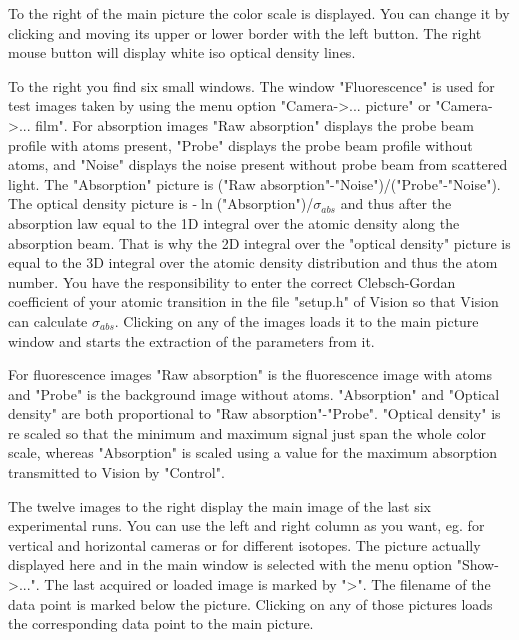 \documentclass[10pt]{article}
\begin{document}
To the right of the main picture the color scale is displayed. You
can change it by clicking and moving its upper or lower border
with the left button. The right mouse button will display white
iso optical density lines.

To the right you find six small windows. The window "Fluorescence"
is used for test images taken by using the menu option
"Camera->... picture" or "Camera->... film". For absorption images
"Raw absorption" displays the probe beam profile with atoms
present, "Probe" displays the probe beam profile without atoms,
and "Noise" displays the noise present without probe beam from
scattered light. The "Absorption" picture is ("Raw
absorption"-"Noise")/("Probe"-"Noise"). The optical density
picture is -$\ln$("Absorption")/$\sigma_{abs}$ and thus after the
absorption law equal to the 1D integral over the atomic density
along the absorption beam. That is why the 2D integral over the
"optical density" picture is equal to the 3D integral over the
atomic density distribution and thus the atom number. You have the
responsibility to enter the correct Clebsch-Gordan coefficient of
your atomic transition in the file "setup.h" of Vision so that
Vision can calculate $\sigma_{abs}$. Clicking on any of the images
loads it to the main picture window and starts the extraction of
the parameters from it.

For fluorescence images "Raw absorption" is the fluorescence image
with atoms and "Probe" is the background image without atoms.
"Absorption" and "Optical density" are both proportional to "Raw
absorption"-"Probe". "Optical density" is re scaled so that the
minimum and maximum signal just span the whole color scale,
whereas "Absorption" is scaled using a value for the maximum
absorption transmitted to Vision by "Control".

The twelve images to the right display the main image of the last
six experimental runs. You can use the left and right column as
you want, eg. for vertical and horizontal cameras or for different
isotopes. The picture actually displayed here and in the main
window is selected with the menu option "Show->...". The last
acquired or loaded image is marked by ">". The filename of the
data point is marked below the picture. Clicking on any of those
pictures loads the corresponding data point to the main picture.
\end{document}
